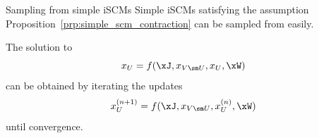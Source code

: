 \begin{frame}{Sampling from simple iSCMs}
Simple iSCMs satisfying the assumption Proposition~\ref{prp:simple_scm_contraction} can be sampled from easily.
\begin{Rem}
   The solution to 
  $$x_U = f(\xJ,x_{V\sm U},x_U,\xW)$$
can be obtained by iterating the updates
  $$x_U^{(n+1)} = f(\xJ,x_{V\sm U},x_U^{(n)},\xW)$$
until convergence.
\end{Rem}
\end{frame}

